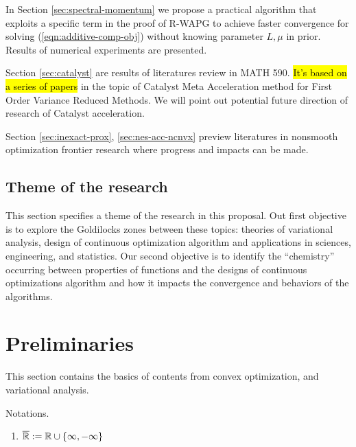 \documentclass[12pt]{article}
\begin{document}
    In Section \ref{sec:spectral-momentum} we propose a practical algorithm that exploits a specific term in the proof of R-WAPG to achieve faster convergence for solving (\ref{eqn:additive-comp-obj}) without knowing parameter $L, \mu$ in prior. 
    Results of numerical experiments are presented. 
    \par
    Section \ref{sec:catalyst} are results of literatures review in MATH 590. 
    {\hl{It's based on a series of papers}} in the topic of Catalyst Meta Acceleration method for First Order Variance Reduced Methods. 
    We will point out potential future direction of research of Catalyst acceleration. 
    \par
    Section \ref{sec:inexact-prox}, \ref{sec:nes-acc-ncnvx} preview literatures in nonsmooth optimization frontier research where progress and impacts can be made.  
    \subsection{Theme of the research}
        This section specifies a theme of the research in this proposal. 
        Out first objective is to explore the Goldilocks zones between these topics: theories of variational analysis, design of continuous optimization algorithm and applications in sciences, engineering, and statistics.  
        Our second objective is to identify the ``chemistry'' occurring between properties of functions and the designs of continuous optimizations algorithm and how it impacts the convergence and behaviors of the algorithms. 


    
\section{Preliminaries}
    This section contains the basics of contents from convex optimization, and variational analysis. 
    \par
    Notations. 
    \begin{enumerate}
        \item $\overline {\mathbb R} := \mathbb R \cup \{\infty, -\infty\}$
    \end{enumerate}
\end{document}
